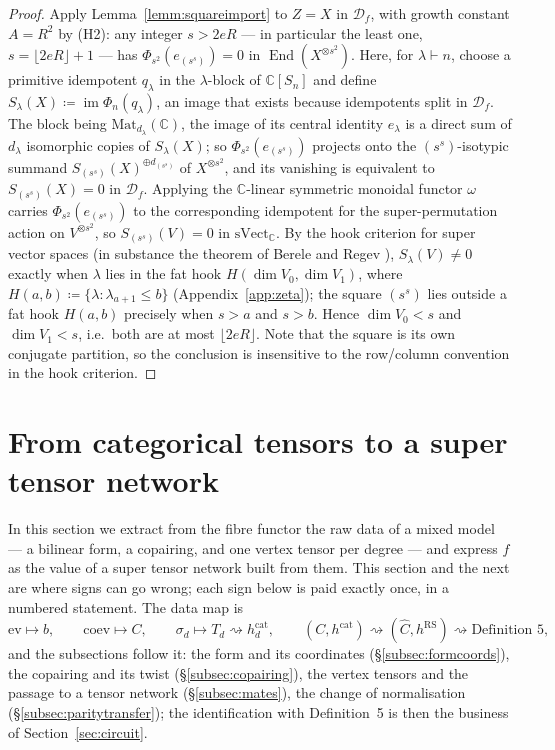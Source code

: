\documentclass[11pt]{article}
\newcommand{\cauchy}{\mathcal{D}_{f}}             %
\newcommand{\genX}{X}                             %
\newcommand{\End}{\operatorname{End}}
\newcommand{\fib}{\omega}                         %
\newcommand{\svect}{\mathrm{sVect}_{\mathbb{C}}}
\newcommand{\copair}{C}                           %
\newcommand{\twistedC}{\widehat{C}}               %
\newcommand{\hook}[2]{H(#1,#2)}                   %
\begin{document}
\begin{proof}
Apply Lemma~\ref{lemm:squareimport} to $Z=\genX$ in $\cauchy$,
with growth constant $A=R^{2}$ by (H2): any integer $s>2eR$ ---
in particular the least one, $s=\lfloor 2eR\rfloor+1$ --- has
$\Phi_{s^{2}}(e_{(s^{s})})=0$ in $\End(\genX^{\otimes s^{2}})$.
Here, for $\lambda\vdash n$, choose a primitive idempotent
$q_{\lambda}$ in the
$\lambda$-block of $\mathbb{C}[S_{n}]$ and define
$S_{\lambda}(\genX)\coloneqq\operatorname{im}\Phi_{n}(q_{\lambda})$,
an image that exists because idempotents split in $\cauchy$. The
block being $\mathrm{Mat}_{d_{\lambda}}(\mathbb{C})$, the image
of its central identity $e_{\lambda}$ is a direct sum of
$d_{\lambda}$ isomorphic copies of $S_{\lambda}(\genX)$; so
$\Phi_{s^{2}}(e_{(s^{s})})$ projects onto the $(s^{s})$-isotypic
summand $S_{(s^{s})}(\genX)^{\oplus d_{(s^{s})}}$ of
$\genX^{\otimes s^{2}}$, and its vanishing is
equivalent to $S_{(s^{s})}(\genX)=0$ in $\cauchy$. Applying the
$\mathbb{C}$-linear symmetric monoidal functor $\fib$ carries
$\Phi_{s^{2}}(e_{(s^{s})})$ to the corresponding idempotent for
the super-permutation action on $V^{\otimes s^{2}}$, so
$S_{(s^{s})}(V)=0$ in $\svect$. By the hook criterion for super
vector spaces \cite[Cor.~1.9]{Del02} (in substance the theorem of
Berele and Regev \cite{BR87}), $S_{\lambda}(V)\ne0$ exactly when
$\lambda$ lies in the fat hook $\hook{\dim V_{0}}{\dim V_{1}}$,
where $\hook{a}{b}\coloneqq\{\lambda:\lambda_{a+1}\le b\}$
(Appendix~\ref{app:zeta});
the square $(s^{s})$ lies outside a fat hook $\hook{a}{b}$
precisely when $s>a$ and $s>b$. Hence $\dim V_{0}<s$ and
$\dim V_{1}<s$, i.e.\ both are at most $\lfloor 2eR\rfloor$. Note that the square is its own conjugate
partition, so the conclusion is insensitive to the row/column
convention in the hook criterion.
\end{proof}

\section{From categorical tensors to a super tensor
network}\label{sec:extraction}

In this section we extract from the fibre functor the raw data
of a mixed model --- a bilinear form, a copairing, and one vertex
tensor per degree --- and express $f$ as the value of a super tensor
network built from them. This section and the next are where
signs can go wrong; each sign below is paid exactly once, in a
numbered statement. The data map is
\[
\mathrm{ev}\mapsto b,\qquad
\mathrm{coev}\mapsto\copair,\qquad
\sigma_{d}\mapsto T_{d}\rightsquigarrow h^{\mathrm{cat}}_{d},\qquad
(\copair,h^{\mathrm{cat}})\rightsquigarrow
(\twistedC,h^{\mathrm{RS}})
\rightsquigarrow\text{Definition~5},
\]
and the subsections follow it: the form and its coordinates
(\S\ref{subsec:formcoords}), the copairing and its twist
(\S\ref{subsec:copairing}), the vertex tensors and the passage to
a tensor network (\S\ref{subsec:mates}), the change of
normalisation (\S\ref{subsec:paritytransfer}); the identification
with Definition~5 is then the business of
Section~\ref{sec:circuit}.
\end{document}
